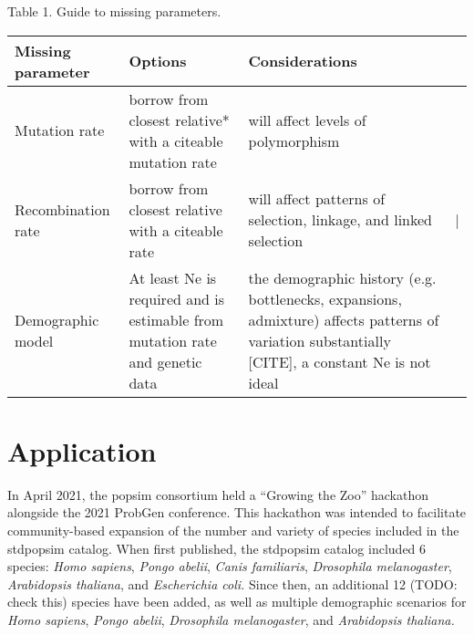 \documentclass[hidelinks]{article}
\begin{document}
Table 1. Guide to missing parameters.

\begin{table}[]
    \begin{tabular}{@{}llll@{}}
    \toprule
    Missing parameter                        & Options                                                                          & Considerations                                                                                                                                       &   \\ \midrule
    \multicolumn{1}{|l|}{Mutation rate}      & \multicolumn{1}{l|}{borrow from closest relative* with a citeable mutation rate} & \multicolumn{1}{l|}{will affect levels of polymorphism}                                                                                              &   \\ \cmidrule(r){1-3}
    \multicolumn{1}{|l|}{Recombination rate} & \multicolumn{1}{l|}{borrow from closest relative with a citeable rate}           & \multicolumn{1}{l|}{will affect patterns of selection, linkage, and linked selection}                                                                & | \\ \cmidrule(r){1-3}
    Demographic model                        & At least Ne is required and is estimable from mutation rate and genetic data     & the demographic history (e.g. bottlenecks, expansions, admixture) affects patterns of variation substantially {[}CITE{]}, a constant Ne is not ideal &   \\ \bottomrule
    \end{tabular}
\end{table}

\hypertarget{application}{%
\section{Application}\label{application}}

In April 2021, the popsim consortium held a ``Growing the Zoo''
hackathon alongside the 2021 ProbGen conference. This hackathon was
intended to facilitate community-based expansion of the number and
variety of species included in the stdpopsim catalog. When first
published, the stdpopsim catalog included 6 species: \emph{Homo
sapiens}, \emph{Pongo abelii}, \emph{Canis familiaris}, \emph{Drosophila
melanogaster}, \emph{Arabidopsis thaliana}, and \emph{Escherichia coli.}
Since then, an additional 12 (TODO: check this) species have been added,
as well as multiple demographic scenarios for \emph{Homo sapiens},
\emph{Pongo abelii}, \emph{Drosophila melanogaster}, and
\emph{Arabidopsis thaliana.}
\end{document}
